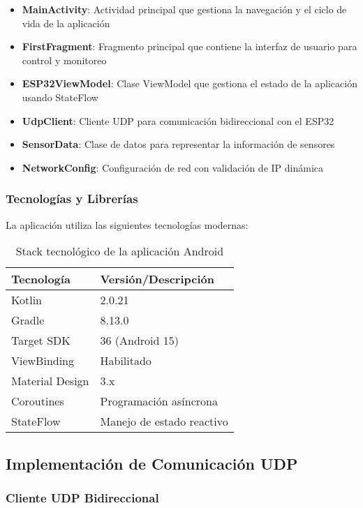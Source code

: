 \documentclass[conference,a4paper]{IEEEtran}
\begin{document}
\begin{itemize}
    \item \textbf{MainActivity}: Actividad principal que gestiona la navegaci\'on y el ciclo de vida de la aplicaci\'on
    \item \textbf{FirstFragment}: Fragmento principal que contiene la interfaz de usuario para control y monitoreo
    \item \textbf{ESP32ViewModel}: Clase ViewModel que gestiona el estado de la aplicaci\'on usando StateFlow
    \item \textbf{UdpClient}: Cliente UDP para comunicaci\'on bidireccional con el ESP32
    \item \textbf{SensorData}: Clase de datos para representar la informaci\'on de sensores
    \item \textbf{NetworkConfig}: Configuraci\'on de red con validaci\'on de IP din\'amica
\end{itemize}

\subsubsection{Tecnolog\'ias y Librer\'ias}

La aplicaci\'on utiliza las siguientes tecnolog\'ias modernas:

\begin{table}[H]
\centering
\caption{Stack tecnol\'ogico de la aplicaci\'on Android}
\begin{tabular}{@{}ll@{}}
\toprule
\textbf{Tecnolog\'ia} & \textbf{Versi\'on/Descripci\'on} \\
\midrule
Kotlin & 2.0.21 \\
Gradle & 8.13.0 \\
Target SDK & 36 (Android 15) \\
ViewBinding & Habilitado \\
Material Design & 3.x \\
Coroutines & Programaci\'on as\'incrona \\
StateFlow & Manejo de estado reactivo \\
\bottomrule
\end{tabular}
\label{tab:android_stack}
\end{table}

\subsection{Implementaci\'on de Comunicaci\'on UDP}

\subsubsection{Cliente UDP Bidireccional}
\end{document}
